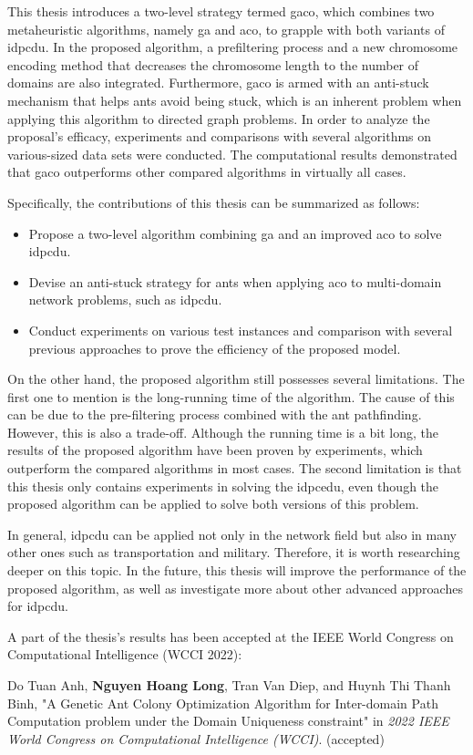 This thesis introduces a two-level strategy termed \acrshort{gaco}, which combines two metaheuristic algorithms, namely \gls{ga} and \gls{aco}, to grapple with both variants of \gls{idpcdu}. In the proposed algorithm, a prefiltering process and a new chromosome encoding method that decreases the chromosome length to the number of domains are also integrated. Furthermore, \acrshort{gaco} is armed with an anti-stuck mechanism that helps ants avoid being stuck, which is an inherent problem when applying this algorithm to directed graph problems. In order to analyze the proposal’s efficacy, experiments and comparisons with several algorithms on various-sized data sets were conducted. The computational results demonstrated that \acrshort{gaco} outperforms other compared algorithms in virtually all cases.

Specifically, the contributions of this thesis can be summarized as follows:
\begin{itemize}
	\item Propose a two-level algorithm combining \gls{ga} and an improved \gls{aco} to solve \gls{idpcdu}.
	\item Devise an anti-stuck strategy for ants when applying \gls{aco} to multi-domain network problems, such as \gls{idpcdu}.
	\item Conduct experiments on various test instances and comparison with several previous approaches to prove the efficiency of the proposed model.
\end{itemize}

On the other hand, the proposed algorithm still possesses several limitations. The first one to mention is the long-running time of the algorithm. The cause of this can be due to the pre-filtering process combined with the ant pathfinding. However, this is also a trade-off. Although the running time is a bit long, the results of the proposed algorithm have been proven by experiments, which outperform the compared algorithms in most cases. The second limitation is that this thesis only contains experiments in solving the \gls{idpcedu}, even though the proposed algorithm can be applied to solve both versions of this problem.

In general, \gls{idpcdu} can be applied not only in the network field but also in many other ones such as transportation and military. Therefore, it is worth researching deeper on this topic. In the future, this thesis will improve the performance of the proposed algorithm, as well as investigate more about other advanced approaches for \gls{idpcdu}.

A part of the thesis's results has been accepted at the IEEE World Congress on Computational Intelligence (WCCI 2022):

Do Tuan Anh, \textbf{Nguyen Hoang Long}, Tran Van Diep, and Huynh Thi Thanh Binh, "A Genetic Ant Colony Optimization Algorithm for Inter-domain Path Computation problem under the Domain Uniqueness constraint" in \textit{ 2022 IEEE World Congress on Computational Intelligence (WCCI)}. (accepted)
